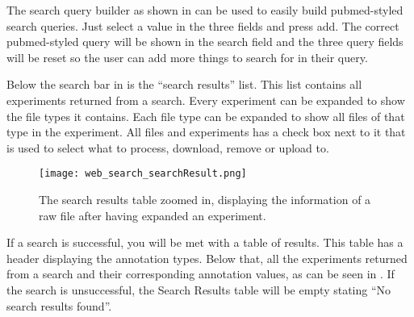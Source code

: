 The search query builder as shown in  can be used to easily build pubmed-styled search queries. Just select a value in the three fields and press add. The correct pubmed-styled query will be shown in the search field and the three query fields will be reset so the user can add more things to search for in their query.

Below the search bar in  is the “search results” list. This list contains all experiments returned from a search. Every experiment can be expanded to show the file types it contains. Each file type can be expanded to show all files of that type in the experiment. All files and experiments has a check box next to it that is used to select what to process, download, remove or upload to.

\begin{figure}[h]
\centering
\texttt{[image: web\_search\_searchResult.png]}
\caption{\label{fig:web_search_searchResult}The search results table zoomed in, displaying the information of a raw file after having expanded an experiment.}
\end{figure}

\FloatBarrier
If a search is successful, you will be met with a table of results. This table has a header displaying the annotation types. Below that, all the experiments returned from a search and their corresponding annotation values, as can be seen in .
If the search is unsuccessful, the Search Results table will be empty stating “No search results found”.
\FloatBarrier

\pagebreak
